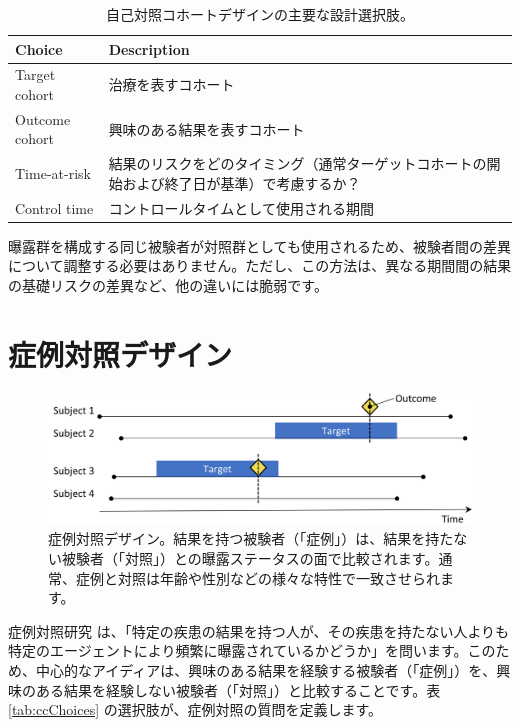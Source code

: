 \documentclass[
  11pt]{book}
\theoremstyle{definition}
\theoremstyle{definition}
\theoremstyle{definition}
\theoremstyle{definition}
\theoremstyle{remark}
\begin{document}
\begin{table}
\centering
\caption{\label{tab:sccChoices}自己対照コホートデザインの主要な設計選択肢。}
\centering
\begin{tabular}[t]{l>{\raggedright\arraybackslash}p{9cm}}
\toprule
Choice & Description\\
\midrule
Target cohort & 治療を表すコホート\\
Outcome cohort & 興味のある結果を表すコホート\\
Time-at-risk & 結果のリスクをどのタイミング（通常ターゲットコホートの開始および終了日が基準）で考慮するか？\\
Control time & コントロールタイムとして使用される期間\\
\bottomrule
\end{tabular}
\end{table}

曝露群を構成する同じ被験者が対照群としても使用されるため、被験者間の差異について調整する必要はありません。ただし、この方法は、異なる期間間の結果の基礎リスクの差異など、他の違いには脆弱です。

\section{症例対照デザイン}\label{ux75c7ux4f8bux5bfeux7167ux30c7ux30b6ux30a4ux30f3}


\begin{figure}[h]

{\centering \includegraphics[width=0.9\linewidth]{images/PopulationLevelEstimation/caseControl} 

}

\caption{症例対照デザイン。結果を持つ被験者（「症例」）は、結果を持たない被験者（「対照」）との曝露ステータスの面で比較されます。通常、症例と対照は年齢や性別などの様々な特性で一致させられます。}\label{fig:caseControl}
\end{figure}

症例対照研究 \citep[ ]{vandenbroucke_2012} は、「特定の疾患の結果を持つ人が、その疾患を持たない人よりも特定のエージェントにより頻繁に曝露されているかどうか」を問います。このため、中心的なアイディアは、興味のある結果を経験する被験者（「症例」）を、興味のある結果を経験しない被験者（「対照」）と比較することです。表 \ref{tab:ccChoices} の選択肢が、症例対照の質問を定義します。  
\end{document}
